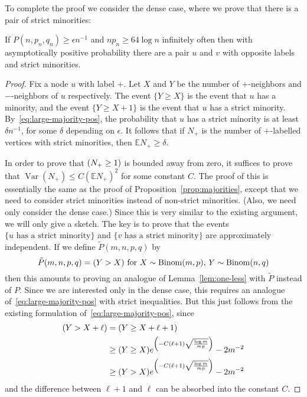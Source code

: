 \documentclass[EJP,final]{ejpecp}
\newcommand{\E}{\mathbb{E}}
\newcommand{\1}[1]{\mathbbm{1}_{\{#1\}}}
\let\Pr\relax
\DeclareMathOperator{\Pr}{Pr}
\DeclareMathOperator{\Var}{Var}
\DeclareMathOperator{\Binom}{Binom}
\begin{document}
To complete the proof we consider the dense case, where we prove that there is a pair of strict minorities:

\begin{lemma}\label{lem:erratum-dense}
    If $P(n, p_n, q_n) \ge \epsilon n^{-1}$ and $np_n \ge 64 \log n$ infinitely
    often then with asymptotically positive probability there are a pair $u$
    and $v$ with opposite labels and strict minorities.
\end{lemma}

\begin{proof}
    Fix a node $u$ with label $+$. Let $X$ and $Y$ be the number of
    $+$-neighbors and $-$-neighbors of $u$ respectively. The event $\{Y \ge
    X\}$ is the event that $u$ has a minority, and the event $\{Y \ge X + 1\}$
    is the event that $u$ has a strict minority.
    By~\eqref{eq:large-majority-pos}, the probability that $u$ has a strict
    minority is at least $\delta n^{-1}$, for some $\delta$ depending on
    $\epsilon$.  It follows that if $N_+$ is the number of $+$-labelled
    vertices with strict minorities, then $\E N_+ \ge \delta$.
    
    In order to
    prove that $\Pr(N_+ \ge 1)$ is bounded away from zero, it suffices to prove that
    $\Var(N_+) \le C (\E N_+)^2$ for some constant $C$. The proof of this is
    essentially the same as the proof of Proposition~\ref{prop:majorities},
    except that we need to consider strict minorities instead of non-strict
    minorities. (Also, we need only consider the dense case.) Since this
    is very similar to the existing argument, we will only give a sketch.
    The key is to prove that the events $\{u \text{ has a strict minority}\}$
    and $\{v \text{ has a strict minority}\}$ are approximately independent.
    If we define $\tilde P(m, n, p, q)$ by
    \[
        \tilde P(m, n, p, q) = \Pr(Y > X) \text{ for $X \sim \Binom(m, p)$, $Y \sim \Binom(n, q)$}
    \]
    then this amounts to proving an analogue of Lemma~\ref{lem:one-less} with
    $\tilde P$ instead of $P$. Since we are interested only in the dense case,
    this requires an analogue of~\eqref{eq:large-majority-pos} with strict inequalities.
    But this just follows from the existing formulation of~\eqref{eq:large-majority-pos},
    since
    \begin{align*}
        \Pr(Y > X + \ell)
        &= \Pr(Y \ge X + \ell + 1) \\
        &\ge \Pr(Y \ge X) e^{\left(-C (\ell+1) \sqrt{\frac{\log m}{mp}}\right)} - 2 m^{-2} \\
        &\ge \Pr(Y > X) e^{\left(-C (\ell+1) \sqrt{\frac{\log m}{mp}}\right)} - 2 m^{-2}
    \end{align*}
    and the difference between $\ell+1$ and $\ell$ can be absorbed into the constant $C$.


\end{proof}
\end{document}
